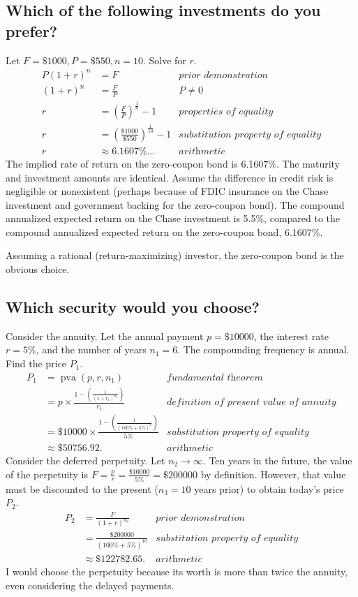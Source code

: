 \documentclass[12pt]{article}
\DeclareMathOperator{\pva}{pva}
\begin{document}
\subsection{Which of the following investments do you prefer?}
Let $F=\$1000,P=\$550,n=10$. Solve for $r$.
\begin{align*}
P(1+r)^n&=F&\textit{prior demonstration}\\
(1+r)^n&=\frac{F}{P}&\textit{$P\neq 0$}\\
r&=\left(\frac{F}{P}\right)^{\frac{1}{n}}-1&\textit{properties of equality}\\
r&=\left(\frac{\$1000}{\$550}\right)^{\frac{1}{10}}-1&\textit{substitution property of equality}\\
r&\approx 6.1607\%\dots&\textit{arithmetic}
\end{align*}
The implied rate of return on the zero-coupon bond is 6.1607\%. The maturity and investment amounts are identical. Assume the difference in credit risk is negligible or nonexistent (perhaps because of FDIC insurance on the Chase investment and government backing for the zero-coupon bond). The compound annualized expected return on the Chase investment is 5.5\%, compared to the compound annualized expected return on the zero-coupon bond, 6.1607\%.

Assuming a rational (return-maximizing) investor, the zero-coupon bond is the obvious choice.
\subsection{Which security would you choose?}
Consider the annuity. Let the annual payment $p=\$10000$, the interest rate $r=5\%$, and the number of years $n_1=6$. The compounding frequency is annual. Find the price $P_1$.
\begin{align*}
P_1&=\pva(p,r,n_1)&\textit{fundamental theorem}\\
&=p\times\frac{1-\left(\frac{1}{(1+r_1)^{n_1}}\right)}{r_1}&\textit{definition of present value of annuity}\\
&=\$10000\times\frac{1-\left(\frac{1}{(100\%+5\%)^6}\right)}{5\%}&\textit{substitution property of equality}\\
&\approx\$50756.92.&\textit{arithmetic}
\end{align*}
Consider the deferred perpetuity. Let $n_2\to\infty$. Ten years in the future, the value of the perpetuity is $F=\frac{p}{r}=\frac{\$10000}{5\%}=\$200000$ by definition. However, that value must be discounted to the present ($n_3=10$ years prior) to obtain today's price $P_2$.
\begin{align*}
P_2&=\frac{F}{(1+r)^{n_3}}&\textit{prior demonstration}\\
&=\frac{\$200000}{(100\%+5\%)^{10}}&\textit{substitution property of equality}\\
&\approx\$122782.65.&\textit{arithmetic}
\end{align*}
I would choose the perpetuity because its worth is more than twice the annuity, even considering the delayed payments.
\end{document}
